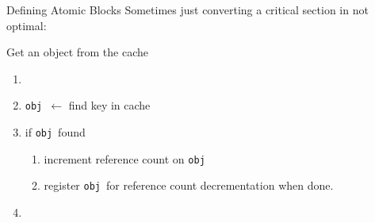 \documentclass[]{beamer}
\newcommand{\obj}{{\tt obj}~}
\begin{document}
\begin{frame}{Defining Atomic Blocks}
Sometimes just converting a critical section in not optimal:
\begin{exampleblock}{Get an object from the cache}
\begin{enumerate}
\item<alert@1-2> 
\item \obj $\leftarrow$ find key in cache
\item if \obj found
\begin{enumerate}
\item increment reference count on \obj
\item<alert@3> register \obj for reference count decrementation when done.
\end{enumerate}
\item<alert@1-2> 
\end{enumerate}
\end{exampleblock}
\end{frame}
\end{document}
